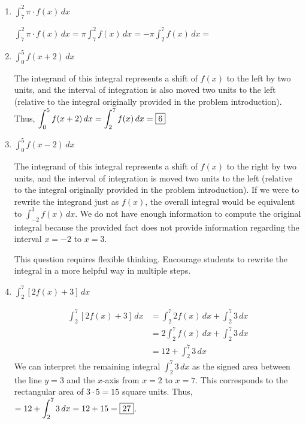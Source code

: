 \documentclass{article}
\begin{document}
\begin{enumerate}
\begin{enumerate}
   
\vfill
    \item $\displaystyle \int_7^2 \pi\cdot f(x)\,dx$
    
    \begin{solution}
     $\displaystyle \int_7^2 \pi\cdot f(x)\,dx=\pi \displaystyle \int_7^2  f(x)\,dx=-\pi \displaystyle \int_2^7  f(x)\,dx=$\fbox{$-6\pi$}  
    \end{solution}
    \vfill
    
\item $\displaystyle \int_0^5 f(x+2)\,dx$
    
    \begin{solution}
    The integrand of this integral represents a shift of $f(x)$ to the left by two units, and the interval of integration is also moved two units to the left (relative to the integral originally provided in the problem introduction).  Thus, 
    $\displaystyle \int_0^5 f(x+2)\,dx=\displaystyle \int_2^7 f(x)\,dx=\fbox{6}$
    \end{solution}
    \vfill
    
\item $\displaystyle \int_0^5 f(x-2)\,dx$   

\begin{solution}
    The integrand of this integral represents a shift of $f(x)$ to the right by two units, and the interval of integration is moved two units to the left (relative to the integral originally provided in the problem introduction). If we were to rewrite the integrand just as $f(x)$, the overall integral would be equivalent to $\displaystyle \int_{-2}^3 f(x)\,dx$. We do not have enough information to compute the original integral because the provided fact does not provide information regarding the interval $x=-2$ to $x=3$. 
\end{solution}
\vfill
    
    
\begin{workshop}
    This question requires flexible thinking. Encourage students to rewrite the integral in a more helpful way in multiple steps.
\end{workshop}
  \item $\displaystyle \int_2^7  [2f(x)+3]\,dx$
  
  \begin{solution}
  \begin{align*} 
\displaystyle \int_2^7  [2f(x)+3]\,dx&=\displaystyle \int_2^7  2f(x)\,dx+\displaystyle \int_2^7 3\,dx\\&=2\displaystyle \int_2^7 f(x)\,dx+\displaystyle \int_2^7 3\,dx\\&=12+\displaystyle \int_2^7 3\,dx 
\end{align*}
We can interpret the remaining integral $\displaystyle \int_2^7 3\,dx $ as the signed area between the line $y=3$ and the $x$-axis from $x=2$ to $x=7$. This corresponds to the rectangular area of $3\cdot5=15$ square units. Thus, $=12+\displaystyle \int_2^7 3\,dx=12+15=\fbox{27}$. 
  \end{solution}
  \vfill
  \vfill


\end{enumerate}
\end{enumerate}
\end{document}
